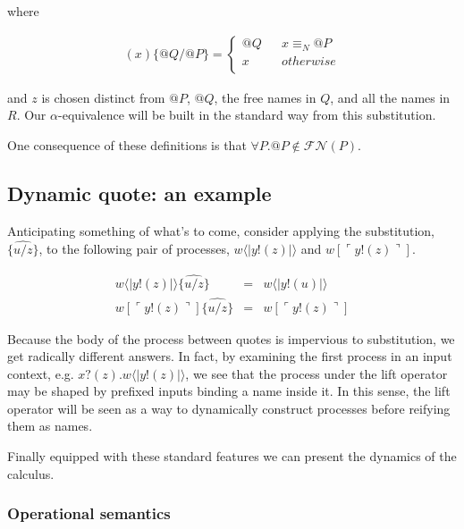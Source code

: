 \documentclass{llncs}
\makeatletter
\newcommand{\lliftb}{\langle\!|}
\newcommand{\rliftb}{|\!\rangle}
\newcommand{\lpquote}{\ulcorner}
\newcommand{\rpquote}{\urcorner}
\newcommand{\id}[1]{\texttt{#1}}
\newcommand{\nameeq}{\mathbin{\equiv_N}}
\newcommand{\freenames}[1]{\mathbin{\mathcal{FN}(#1)}}
\newcommand{\lift}[2]{#1 \lliftb #2 \rliftb}
\newcommand{\quotep}[1]{\mathsf{@}#1}
\makeatother
\begin{document}
where

\begin{eqnarray}
  (x)\id{\{} \quotep{Q} / \quotep{P} \id{\}}            = 
  \left\{ 
    \begin{array}{ccc}
      \quotep{Q} & & x \nameeq \quotep{P} \\
      x & & otherwise \\
    \end{array}
  \right. \nonumber
\end{eqnarray}

and $z$ is chosen distinct from $\quotep{P}$, $\quotep{Q}$, the free
names in $Q$, and all the names in $R$. Our $\alpha$-equivalence will
be built in the standard way from this substitution.

\begin{remark}\label{rem:no_self_referential_names}
  One consequence of these definitions is that $\forall P. \quotep{P}
  \not\in \freenames{P}$.
\end{remark}

\subsection{ Dynamic quote: an example }

Anticipating something of what's to come, consider applying the
substitution, $\widehat{\id{\{}u / z \id{\}}}$, to the following pair
of processes, $\lift{w}{y!(z)}$ and $w[ \lpquote y!(z) \rpquote ]$.

\begin{eqnarray}
	\lift{w}{y!(z)}\widehat{\id{\{}u / z \id{\}}}
		& = &
		\lift{w}{y!(u)} \nonumber\\
	w[ \lpquote y!(z) \rpquote ] \widehat{ \id{\{}u / z \id{\}} }
		& = &
		w[ \lpquote y!(z) \rpquote ] \nonumber
\end{eqnarray}

Because the body of the process between quotes is impervious to
substitution, we get radically different answers. In fact, by
examining the first process in an input context,
e.g. $x?(z).\lift{w}{y!(z)}$, we see that the process under the lift
operator may be shaped by prefixed inputs binding a name inside it. In
this sense, the lift operator will be seen as a way to dynamically
construct processes before reifying them as names.

Finally equipped with these standard features we can present the
dynamics of the calculus.

\subsubsection{Operational semantics} 
\end{document}
